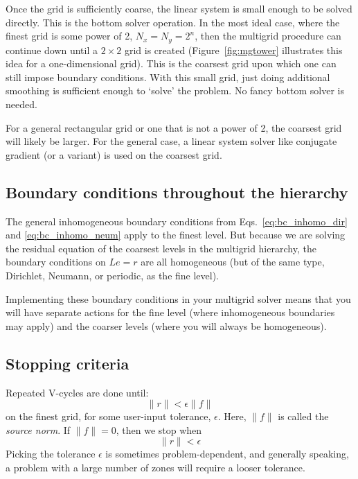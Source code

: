 Once the grid is sufficiently coarse, the linear system is small
enough to be solved directly.  This is the bottom solver operation.
In the most ideal case, where the finest grid is some power of 2, $N_x
= N_y = 2^n$, then the multigrid procedure can continue down until a
$2\times 2$ grid is created (Figure~\ref{fig:mgtower} illustrates this idea
for a one-dimensional grid).  This is the coarsest grid upon which one
can still impose boundary conditions.  With this small grid, just
doing additional smoothing is sufficient enough to `solve' the
problem.  No fancy bottom solver is needed.

For a general rectangular grid or one that is not a power of 2, the
coarsest grid will likely be larger.  For the general case, a linear
system solver like conjugate gradient (or a variant) is used on the
coarsest grid.

\subsection{Boundary conditions throughout the hierarchy}

The general inhomogeneous boundary conditions from
Eqs.~\ref{eq:bc_inhomo_dir} and \ref{eq:bc_inhomo_neum} apply to the
finest level.  But because we are solving the residual equation of the
coarsest levels in the multigrid hierarchy, the boundary conditions on
$Le = r$ are all homogeneous (but of the same type, Dirichlet,
Neumann, or periodic, as the fine level).

Implementing these boundary conditions in your multigrid solver means
that you will have separate actions for the fine level (where
inhomogeneous boundaries may apply) and the coarser levels (where you
will always be homogeneous).



\subsection{Stopping criteria}

Repeated V-cycles are done until:
\begin{equation}
\| r \| < \epsilon \|f\|
\end{equation}
on the finest grid, for some user-input tolerance, $\epsilon$.  Here,
$\|f\|$ is called the {\em source norm}.  If $\|f\| = 0$, then we stop
when
\begin{equation}
\| r \| < \epsilon 
\end{equation}
Picking the tolerance $\epsilon$ is sometimes problem-dependent, and
generally speaking, a problem with a large number of zones will require
a looser tolerance.

